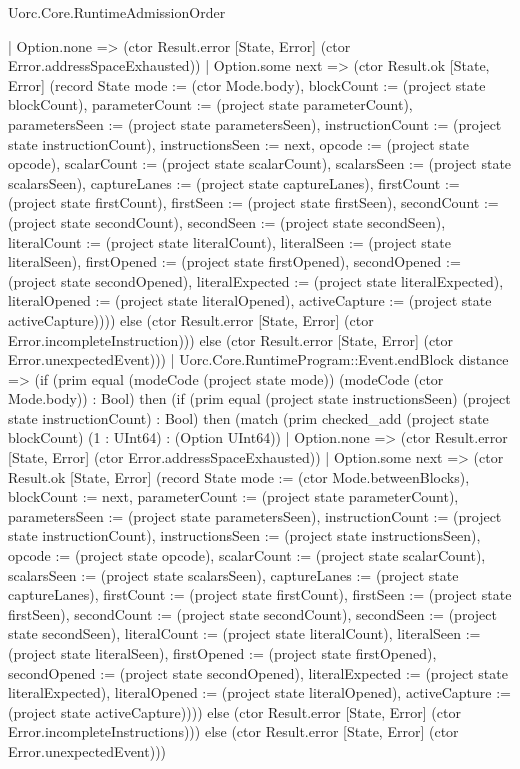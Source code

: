 \begin{lexlean}{Uorc.Core.RuntimeAdmissionOrder}
\begin{semanticmodule}
{      | Option.none => (ctor Result.error [State, Error] (ctor Error.addressSpaceExhausted))
      | Option.some next => (ctor Result.ok [State, Error] (record State {mode := (ctor Mode.body), blockCount := (project state blockCount), parameterCount := (project state parameterCount), parametersSeen := (project state parametersSeen), instructionCount := (project state instructionCount), instructionsSeen := next, opcode := (project state opcode), scalarCount := (project state scalarCount), scalarsSeen := (project state scalarsSeen), captureLanes := (project state captureLanes), firstCount := (project state firstCount), firstSeen := (project state firstSeen), secondCount := (project state secondCount), secondSeen := (project state secondSeen), literalCount := (project state literalCount), literalSeen := (project state literalSeen), firstOpened := (project state firstOpened), secondOpened := (project state secondOpened), literalExpected := (project state literalExpected), literalOpened := (project state literalOpened), activeCapture := (project state activeCapture)}))) else (ctor Result.error [State, Error] (ctor Error.incompleteInstruction))) else (ctor Result.error [State, Error] (ctor Error.unexpectedEvent)))
    | Uorc.Core.RuntimeProgram::Event.endBlock distance => (if (prim equal (modeCode (project state mode)) (modeCode (ctor Mode.body)) : Bool) then (if (prim equal (project state instructionsSeen) (project state instructionCount) : Bool) then (match (prim checked_add (project state blockCount) (1 : UInt64) : (Option UInt64))
      | Option.none => (ctor Result.error [State, Error] (ctor Error.addressSpaceExhausted))
      | Option.some next => (ctor Result.ok [State, Error] (record State {mode := (ctor Mode.betweenBlocks), blockCount := next, parameterCount := (project state parameterCount), parametersSeen := (project state parametersSeen), instructionCount := (project state instructionCount), instructionsSeen := (project state instructionsSeen), opcode := (project state opcode), scalarCount := (project state scalarCount), scalarsSeen := (project state scalarsSeen), captureLanes := (project state captureLanes), firstCount := (project state firstCount), firstSeen := (project state firstSeen), secondCount := (project state secondCount), secondSeen := (project state secondSeen), literalCount := (project state literalCount), literalSeen := (project state literalSeen), firstOpened := (project state firstOpened), secondOpened := (project state secondOpened), literalExpected := (project state literalExpected), literalOpened := (project state literalOpened), activeCapture := (project state activeCapture)}))) else (ctor Result.error [State, Error] (ctor Error.incompleteInstructions))) else (ctor Result.error [State, Error] (ctor Error.unexpectedEvent)))
}
\end{semanticmodule}
\end{lexlean}
